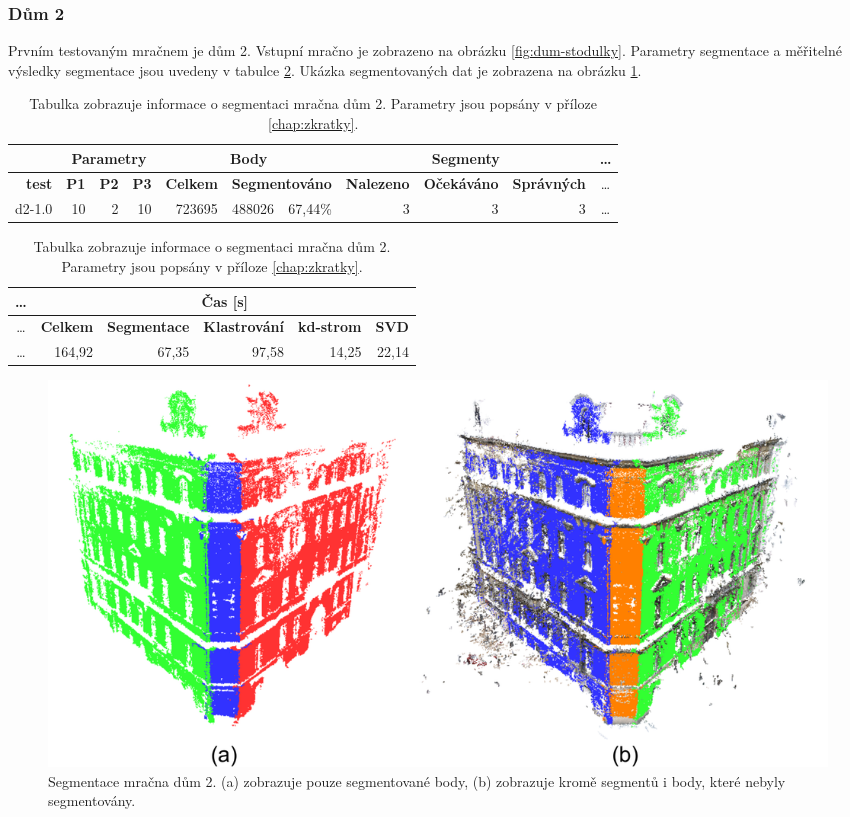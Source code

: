 \documentclass[11pt,twoside,a4paper]{book}
\begin{document}
\newpage
\subsubsection{Dům 2}
Prvním testovaným mračnem je dům 2. Vstupní mračno je zobrazeno na obrázku \ref{fig:dum-stodulky}. Parametry segmentace a měřitelné výsledky segmentace jsou uvedeny v tabulce \ref{table:test-d2}. Ukázka segmentovaných dat je zobrazena na obrázku \ref{fig:test-d2}.

\begin{table}[ht]
\resizebox{\textwidth}{!} {
\begin{tabular}{|r|r|r|r|r|r|r|r|r|r|c|}
\hline
&\multicolumn{3}{c|}{\textbf{Parametry}} & \multicolumn{3}{c|}{\textbf{Body}} & \multicolumn{3}{c|}{\textbf{Segmenty}}&\ldots\\ \hline
\textbf{test} & \textbf{P1} & \textbf{P2} & \textbf{P3} & \textbf{Celkem} & \multicolumn{2}{c|}{\textbf{Segmentováno}} & \textbf{Nalezeno} & \textbf{Očekáváno} & \textbf{Správných} &\ldots\\ \hline
d2-1.0 & 10 & 2 & 10 & 723695 & 488026 & 67,44\% & 3 & 3 & 3 &\ldots\\ \hline
\end{tabular}
}
\begin{flushright} \scalebox{0.9} {
\begin{tabular}{|c|r|r|r|r|r|}
\hline
\ldots&\multicolumn{5}{|c|}{\textbf{Čas [s]}} \\ \hline
\ldots&\textbf{Celkem} & \textbf{Segmentace} & \textbf{Klastrování} & \textbf{kd-strom} & \textbf{SVD} \\\hline
\ldots&164,92 & 67,35 & 97,58 & 14,25 & 22,14 \\ \hline
\end{tabular}
}\end{flushright}

\caption{Tabulka zobrazuje informace o segmentaci mračna dům 2. Parametry jsou popsány v příloze \ref{chap:zkratky}.} 
\label{table:test-d2}
\end{table}


\begin{figure}[ht]
\begin{center}
\includegraphics[width=\textwidth]{figures/test-d2}
\caption{Segmentace mračna dům 2. (a) zobrazuje pouze segmentované body, (b) zobrazuje kromě segmentů i body, které nebyly segmentovány.}
\label{fig:test-d2}
\end{center}
\end{figure}
\end{document}
